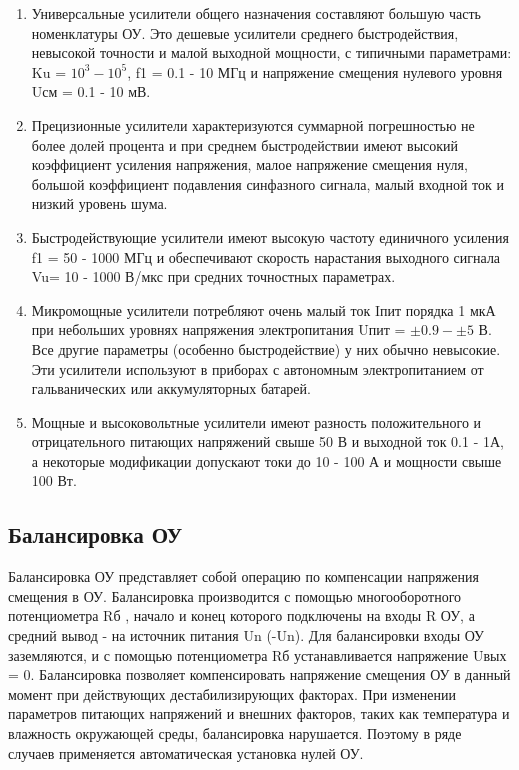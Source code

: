 \documentclass[unicode, 12pt, a4paper, oneside]{article}
\begin{document}
\begin{enumerate}
\item Универсальные усилители общего назначения составляют большую часть номенклатуры ОУ. Это дешевые усилители среднего быстродействия, невысокой точности и малой выходной мощности, с  типичными параметрами: Ku = $10^{3} - 10^{5}$, f1 = 0.1 - 10 МГц и напряжение смещения нулевого уровня Uсм = 0.1 - 10 мВ.
\item Прецизионные усилители характеризуются суммарной погрешностью не более долей процента и при среднем быстродействии имеют высокий коэффициент усиления напряжения, малое напряжение смещения нуля, большой коэффициент подавления синфазного сигнала, малый входной ток и низкий уровень шума.
\item Быстродействующие усилители имеют высокую частоту единичного усиления f1 = 50 - 1000 МГц и обеспечивают скорость нарастания выходного сигнала Vu= 10 - 1000 В/мкс при средних точностных параметрах.
\item Микромощные усилители потребляют очень малый ток Iпит порядка 1 мкА при небольших уровнях напряжения электропитания Uпит = $\pm 0.9 - \pm 5$ В. Все другие параметры (особенно быстродействие) у них обычно невысокие. Эти усилители используют в приборах с автономным электропитанием от гальванических или аккумуляторных батарей.
\item Мощные и высоковольтные усилители имеют разность положительного и отрицательного питающих напряжений свыше 50 В и выходной ток 0.1 - 1А, а некоторые модификации допускают токи до 10 - 100 А и мощности свыше 100 Вт.
\end{enumerate}

\subsection*{Балансировка ОУ}

Балансировка ОУ представляет собой операцию по компенсации напряжения смещения в ОУ. Балансировка производится с помощью многооборотного потенциометра Rб , начало и конец которого подключены на входы R ОУ, а средний вывод - на источник питания Un (-Un). Для балансировки входы ОУ заземляются, и с помощью потенциометра Rб устанавливается напряжение Uвых = 0. Балансировка позволяет компенсировать напряжение смещения ОУ в данный момент при действующих дестабилизирующих факторах. При изменении параметров питающих напряжений и внешних факторов, таких как температура и влажность окружающей среды, балансировка нарушается. Поэтому в ряде случаев применяется автоматическая установка нулей ОУ.
\end{document}
